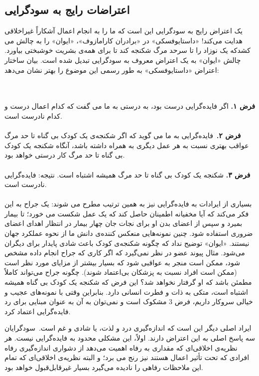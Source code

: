 {
\subsection*{اعتراضات رایج به سودگرایی}
\label{subsec:اعتراضات رایج به سودگرایی}
یک اعتراض رایج به سودگرایی این است که ما را به انجام اعمال آشکاراً غیراخلاقی هدایت می‌کند!
«داستایوفسکی» در «برادران کارامازوف»، «ایوان» را به چالش می کشدکه یک نوزاد را تا سرحد مرگ شکنجه کند تا برای همه‌ی بشریت خوشبختی بیاورد.
چالش «ایوان» به یک اعتراض معروف به سودگرایی تبدیل شده است.
بیان ساختار اعتراض «داستایوفسکی» به طور رسمی این موضوع را بهتر نشان می‌دهد:
}
\\\\
\textbf{فرض ۱.}
اگر فایده‌گرایی درست بود، به درستی به ما می گفت که کدام اعمال درست و کدام نادرست است.
\\\\
\textbf{فرض ۲.}\     فایده‌گرایی به ما می گوید که اگر شکنجه‌ی یک کودک بی گناه تا حد مرگ عواقب بهتری نسبت به هر عمل دیگری به همراه داشته باشد، آنگاه شکنجه یک کودک بی گناه تا حد مرگ کار درستی خواهد بود.
\\\\
\textbf{فرض ۳.}
شکنجه یک کودک بی گناه تا حد مرگ همیشه اشتباه است.
نتیجه: فایده‌گرایی نادرست است.
\\\\
بسیاری از ایرادات به فایده‌گرایی نیز به همین ترتیب مطرح می شوند: یک جراح به این فکر می‌کند که آیا مخفیانه اطمینان حاصل کند که یک عمل شکست می خورد؛ تا بیمار بمیرد و سپس از اعضای بدن او برای نجات جان چهار بیمار در انتظار اهدای اعضای ضروری استفاده شود.
چنین نمونه‌هایی منعکس کننده‌ی دانش ما از نحوه عملکرد جهان نیستند.
«ایوان» توضیح نداد که چگونه شکنجه‌ی کودک باعث شادی پایدار برای دیگران می‌شود.
مثال پیوند عضو در نظر نمی‌گیرد که اگر کاری که جراح انجام داده مشخص شود، ممکن است منجر به عواقبی شود که بسیار بیشتر از مزایای مورد نظر است (ممکن است افراد نسبت به پزشکان بی‌اعتماد شوند).
چگونه جراح می‌تواند کاملاً مطمئن باشد که او گرفتار نخواهد شد؟ این فرض که شکنجه یک کودک بی گناه همیشه اشتباه است، متکی به ذات و فطرت انسانی دارد.
بنابراین وقتی با نمونه‌های عجیب و خیالی سروکار داریم، فرض 3 مشکوک است و نمی‌توان به آن به عنوان مبنایی برای رد فایده‌گرایی اعتماد کرد.

ایراد اصلی دیگر این است که اندازه‌گیری درد و لذت، یا شادی و غم است.\     سودگرایان سه پاسخ اصلی به این اعتراض دارند.
اولاً، این مشکلی محدود به فایده‌گرایی نیست.
هر نظریه‌ی اخلاقی‌ای که مقداری به رفاه اهمیت می‌دهد از دشواری اندازه‌گیری رفاه افرادی که تحت تأثیر اعمال هستند نیز رنج می برد؛ و البته نظریه‌ی اخلاقی‌ای که تمام این ملاحظات رفاهی را نادیده می‌گیرد بسیار غیرقابل‌قبول خواهد بود.

